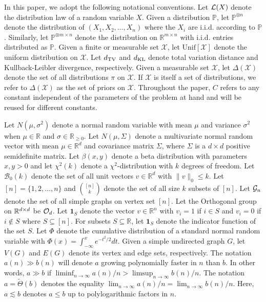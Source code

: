 In this paper, we adopt the following notational conventions. Let $\mathcal{L}(X)$ denote the distribution law of a random variable $X$. Given a distribution $\mathbb{P}$, let $\mathbb{P}^{\otimes n}$ denote the distribution of $(X_1, X_2, \dots, X_n)$ where the $X_i$ are i.i.d. according to $\mathbb{P}$. Similarly, let $\mathbb{P}^{\otimes m \times n}$ denote the distribution on $\mathbb{R}^{m \times n}$ with i.i.d. entries distributed as $\mathbb{P}$. Given a finite or measurable set $\mathcal{X}$, let $\text{Unif}[\mathcal{X}]$ denote the uniform distribution on $\mathcal{X}$. Let $d_{\text{TV}}$ and $d_{\text{KL}}$ denote total variation distance and Kullback-Leibler divergence, respectively. Given a measurable set $\mathcal{X}$, let $\Delta(\mathcal{X})$ denote the set of all distributions $\pi$ on $\mathcal{X}$. If $\mathcal{X}$ is itself a set of distributions, we refer to $\Delta(\mathcal{X})$ as the set of priors on $\mathcal{X}$. Throughout the paper, $C$ refers to any constant independent of the parameters of the problem at hand and will be reused for different constants.

Let $N(\mu, \sigma^2)$ denote a normal random variable with mean $\mu$ and variance $\sigma^2$ when $\mu \in \mathbb{R}$ and $\sigma \in \mathbb{R}_{\ge 0}$. Let $N(\mu, \Sigma)$ denote a multivariate normal random vector with mean $\mu \in \mathbb{R}^d$ and covariance matrix $\Sigma$, where $\Sigma$ is a $d \times d$ positive semidefinite matrix. Let $\beta(x, y)$ denote a beta distribution with parameters $x, y > 0$ and let $\chi^2(k)$ denote a $\chi^2$-distribution with $k$ degrees of freedom. Let $\mathcal{B}_0(k)$ denote the set of all unit vectors $v \in \mathbb{R}^d$ with $\| v \|_0 \le k$. Let $[n] = \{1, 2, \dots, n\}$ and $\binom{[n]}{k}$ denote the set of all size $k$ subsets of $[n]$. Let $\mathcal{G}_n$ denote the set of all simple graphs on vertex set $[n]$. Let the Orthogonal group on $\mathbb{R}^{d \times d}$ be $\mathcal{O}_d$. Let $\mathbf{1}_S$ denote the vector $v \in \mathbb{R}^n$ with $v_i = 1$ if $i \in S$ and $v_i = 0$ if $i \not \in S$ where $S \subseteq [n]$. For subsets $S \subseteq \mathbb{R}$, let $\mathbf{1}_S$ denote the indicator function of the set $S$. Let $\Phi$ denote the cumulative distribution of a standard normal random variable with $\Phi(x) = \int_{-\infty}^x e^{-t^2/2} dt$. Given a simple undirected graph $G$, let $V(G)$ and $E(G)$ denote its vertex and edge sets, respectively. The notation $a(n) \gg b(n)$ will denote $a$ growing polynomially faster in $n$ than $b$. In other words, $a \gg b$ if $\liminf_{n \to \infty} a(n)/n > \limsup_{n \to \infty} b(n)/n$. The notation $a = \tilde{\Theta}(b)$ denotes the equality $\lim_{n \to \infty} a(n)/n = \lim_{n \to \infty} b(n)/n$. Here, $a \lesssim b$ denotes $a \le b$ up to polylogarithmic factors in $n$.

